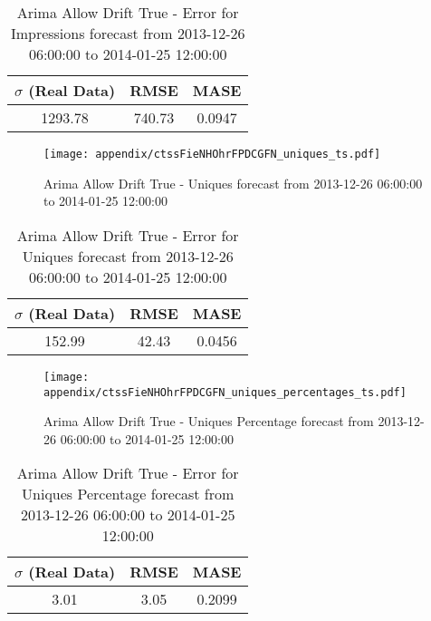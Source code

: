 \begin{table}[H]
\centering
\footnotesize
\begin{tabular}{ccc}
$\sigma$ (Real Data) & RMSE & MASE   \\ \hline
1293.78 & 740.73 & 0.0947 \\
\end{tabular}

\vspace{0.5cm}

\caption{
Arima Allow Drift True - Error for Impressions forecast from 2013-12-26 06:00:00 to 2014-01-25 12:00:00}
\end{table}

\begin{figure}[H] \begin{center} \leavevmode
\texttt{[image: appendix/ctssFieNHOhrFPDCGFN\_uniques\_ts.pdf]} \caption{
Arima Allow Drift True - Uniques forecast from 2013-12-26 06:00:00 to 2014-01-25 12:00:00} \label{fig:appendix/ctssFieNHOhrFPDCGFN_uniques_ts.pdf} \end{center}
\end{figure}

\begin{table}[H]
\centering
\footnotesize
\begin{tabular}{ccc}
$\sigma$ (Real Data) & RMSE & MASE   \\ \hline
152.99 & 42.43 & 0.0456 \\
\end{tabular}

\vspace{0.5cm}

\caption{
Arima Allow Drift True - Error for Uniques forecast from 2013-12-26 06:00:00 to 2014-01-25 12:00:00}
\end{table}

\begin{figure}[H] \begin{center} \leavevmode
\texttt{[image: appendix/ctssFieNHOhrFPDCGFN\_uniques\_percentages\_ts.pdf]} \caption{
Arima Allow Drift True - Uniques Percentage forecast from 2013-12-26 06:00:00 to 2014-01-25 12:00:00} \label{fig:appendix/ctssFieNHOhrFPDCGFN_uniques_percentages_ts.pdf} \end{center}
\end{figure}

\begin{table}[H]
\centering
\footnotesize
\begin{tabular}{ccc}
$\sigma$ (Real Data) & RMSE & MASE   \\ \hline
3.01 & 3.05 & 0.2099 \\
\end{tabular}

\vspace{0.5cm}

\caption{
Arima Allow Drift True - Error for Uniques Percentage forecast from 2013-12-26 06:00:00 to 2014-01-25 12:00:00}
\end{table}

